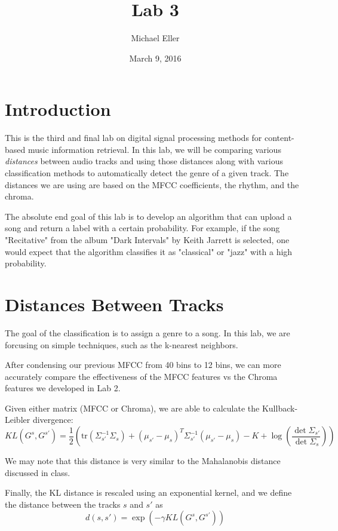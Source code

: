 \documentclass{article} %
\title{Lab 3}
\author{Michael Eller}
\date{March 9, 2016} %
\begin{document}
\maketitle

\tableofcontents
\clearpage
\section{Introduction}


This is the third and final lab on digital signal processing methods for content-based music information retrieval. In this lab, we will be comparing various \emph{distances} between audio
 tracks and using those distances along with various classification methods to  automatically detect the genre of a given track. 
The distances we are using are based on the MFCC coefficients, the rhythm, and the chroma. 

The absolute end goal of this lab is to develop an algorithm that can upload a song and return a label with a certain probability. For example, if the song "Recitative" from the album "Dark
Intervals" by Keith Jarrett is selected, one would expect that the algorithm classifies it as "classical" or "jazz" with a high probability. 


\section{Distances Between Tracks}

The goal of the classification is to assign a genre to a song. In this lab, we are forcusing on simple techniques, such as the k-nearest neighbors. 

After condensing our previous MFCC from 40 bins to 12 bins, we can more accurately compare the effectiveness of the MFCC features vs the Chroma features we developed in Lab 2. 

Given either matrix (MFCC or Chroma), we are able to calculate the Kullback-Leibler divergence:
\begin{equation}
\label{eq:KL}
KL(G^s,G^{s'})=\frac{1}{2}\left (\text{tr}(\Sigma_{s'}^{-1}\Sigma_s) + (\mu_{s'}-\mu_s)^T \Sigma_{s'}^{-1} (\mu_{s'}-\mu_s)-K+
\log\left( \frac{\det \Sigma_{s'}}{\det \Sigma_s} \right) \right )
\end{equation}

We may note that this distance is very similar to the Mahalanobis distance discussed in class. 

Finally, the KL distance is rescaled using an exponential kernel, and we define the distance between the tracks $s$ and $s'$ as
\begin{equation}
\label{eq:KLd}
d(s,s')=\exp \left( -\gamma KL(G^s,G^{s'})\right)
\end{equation}
\end{document}
